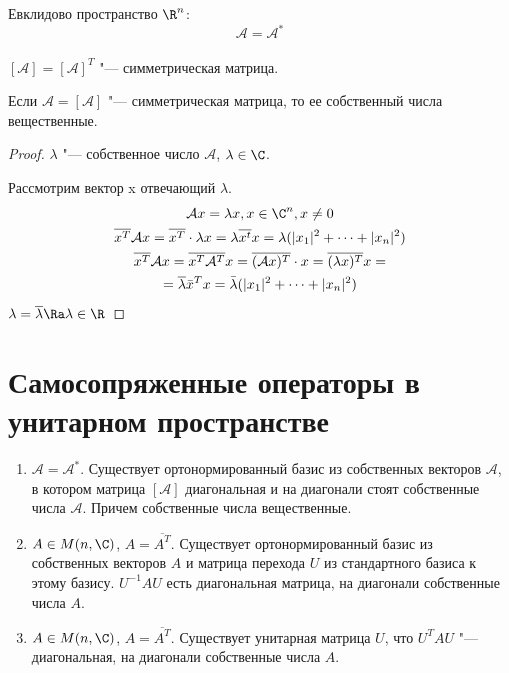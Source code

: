 Евклидово пространство $\R^n$:
\[ \mathcal A = \mathcal{A}^* \] \\
$[\mathcal A] = [\mathcal A]^T$  "--- симметрическая матрица.

\begin{lemma}
	Если $\mathcal A = [\mathcal A]$ "--- симметрическая матрица, то ее собственный числа вещественные.
\end{lemma}

\begin{proof}
	$\lambda$ "--- собственное число $\mathcal A$, $\lambda \in \C$.
	
	Рассмотрим вектор x отвечающий $\lambda$.
	\begin{gather*}
		\mathcal Ax = \lambda x, x \in \C^n, x \ne 0 \\
		\overline{x^T} \mathcal Ax
		= \overline{x^T} \cdot \lambda x
		= \lambda \overline{x^t}x
		= \lambda(|x_1|^2 + \cdots + |x_n|^2) \\
		\overline{x^T} \mathcal Ax
		= \overline{x^T} \overline{\mathcal{A}^T}x
		= \overline{(\mathcal Ax)^T} \cdot x
		= \overline{(\lambda x)^T} x = \\
		= \overline{\lambda}\bar x^Tx = \bar \lambda(|x_1|^2 + \cdots + |x_n|^2)
	\end{gather*}
	$\lambda = \overline{\lambda} \Ra \lambda \in \R$
\end{proof}

\section{Самосопряженные операторы в унитарном пространстве}

\begin{enumerate}
\item
	$\mathcal A = \mathcal{A}^*$.
	Существует ортонормированный базис из собственных векторов $\mathcal A$,
	в котором матрица $[\mathcal A]$ диагональная и на диагонали стоят собственные числа $\mathcal A$.
	Причем собственные числа вещественные.

\item
	$A \in M(n, \C)$, $A = \overline{A^T}$.
	Существует ортонормированный базис из собственных векторов $A$ и матрица перехода $U$ из стандартного базиса к этому базису.
	$U^{-1} A U$ есть диагональная матрица, на диагонали собственные числа $A$.

\item
	$A \in M(n, \C)$, $A = \overline{A^T}$.
	Существует унитарная матрица $U$, что $U^{T}AU$ "--- диагональная, на диагонали собственные числа $A$.
\end{enumerate}

